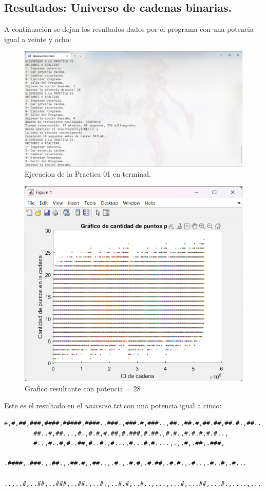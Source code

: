 \documentclass{article}
\begin{document}
    \subsection{Resultados: Universo de cadenas binarias.}
    A continuación se dejan los resultados dados por el programa con una potencia igual a veinte y ocho:
    \begin{figure}[H]
        \centering
        \includegraphics[width=0.75\linewidth]{Terminal.png}
        \caption{Ejecucion de la Practica 01 en terminal.}\label{terminal}
    \end{figure}

    \begin{figure}[H]
        \centering
        \includegraphics[width=0.6\linewidth]{GraficoPuntos.png}
        \caption{Grafico resultante con potencia = 28}\label{graficaDoble}
    \end{figure}

    Este es el resultado en el \textit{universo.txt} con una potencia igual a cinco:
    \begin{lstlisting}[language={},basicstyle=\ttfamily\footnotesize, breaklines=true]
        e,#,##,###,####,#####,####.,###.,###.#,###..,##.,##.#,##.##,##.#.,##..,
        ##..#,##...,#.,#.#,#.##,#.###,#.##.,#.#.,#.#.#,#.#..,
        #..,#..#,#..##,#..#.,#...,#...#,#....,.,.#,.##,.###,
        .####,.###.,.##.,.##.#,.##..,.#.,.#.#,.#.##,.#.#.,.#..,.#..#,.#...
        ..,..#,..##,..###,..##.,..#.,..#.#,..#..,...,...#,...##,...#.,....,....#,.....
    \end{lstlisting}
\end{document}
